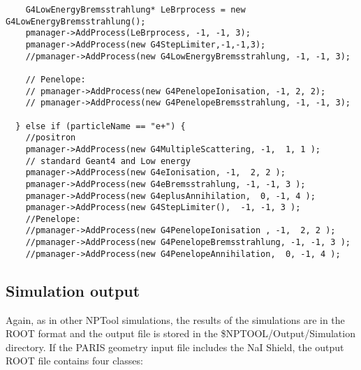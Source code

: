 \documentclass[a4paper,12pt]{article}
\begin{document}
\begin{verbatim}
    G4LowEnergyBremsstrahlung* LeBrprocess = new G4LowEnergyBremsstrahlung();
    pmanager->AddProcess(LeBrprocess, -1, -1, 3);
    pmanager->AddProcess(new G4StepLimiter,-1,-1,3);
    //pmanager->AddProcess(new G4LowEnergyBremsstrahlung, -1, -1, 3);
    
    // Penelope:
    // pmanager->AddProcess(new G4PenelopeIonisation, -1, 2, 2);
    // pmanager->AddProcess(new G4PenelopeBremsstrahlung, -1, -1, 3);
    
  } else if (particleName == "e+") {
    //positron
    pmanager->AddProcess(new G4MultipleScattering, -1,  1, 1 );
    // standard Geant4 and Low energy
    pmanager->AddProcess(new G4eIonisation, -1,  2, 2 );
    pmanager->AddProcess(new G4eBremsstrahlung, -1, -1, 3 );
    pmanager->AddProcess(new G4eplusAnnihilation,  0, -1, 4 );
    pmanager->AddProcess(new G4StepLimiter(),  -1, -1, 3 );
    //Penelope:
    //pmanager->AddProcess(new G4PenelopeIonisation , -1,  2, 2 );
    //pmanager->AddProcess(new G4PenelopeBremsstrahlung, -1, -1, 3 );
    //pmanager->AddProcess(new G4PenelopeAnnihilation,  0, -1, 4 );
\end{verbatim}  
\normalsize

\subsection{Simulation output}
Again, as in other NPTool simulations, the results of the simulations are in the ROOT format 
and the output file is stored in the \$NPTOOL/Output/Simulation directory. If the PARIS 
geometry input file includes the NaI Shield, the output ROOT file contains four classes:
\end{document}

